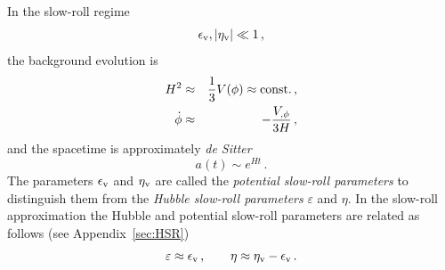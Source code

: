 \documentclass[12pt,letterpaper,rotate]{article}
\def\beq{\begin{equation}}
\def\eeq{\end{equation}}
\begin{document}
{In the slow-roll regime 
\beq
\label{equ:SR}
\epsilon_{\rm v}, |\eta_{\rm v}| \ll 1\, ,
\eeq
the background evolution is
\begin{eqnarray}
H^2 &\approx& {1\over 3} V(\phi) \approx \text{const.}\, , \label{equ:SRH}\\
\dot{\phi} &\approx& -\frac{V_{,\phi}}{3H} \label{equ:SRphi}\, ,
\end{eqnarray}
and the
spacetime is approximately {\it de Sitter}
\begin{equation}
a(t) \sim e^{Ht}\, . %
\end{equation}
The parameters $\epsilon_{\rm v}$ and $\eta_{\rm v}$ are called the {\it potential slow-roll parameters} to distinguish them from the {\it Hubble slow-roll parameters} $\varepsilon$ and $\eta$.
In the slow-roll approximation the Hubble and potential slow-roll parameters are related as follows (see Appendix~\ref{sec:HSR})
\beq
\varepsilon \approx \epsilon_{\rm v} \, , \qquad \eta \approx \eta_{\rm v} - \epsilon_{\rm v}\, .
\eeq

}
\end{document}
